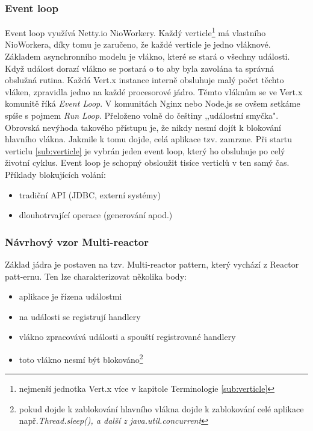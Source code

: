 \subsubsection{Event loop}

Event loop využívá Netty.io NioWorkery. Každý verticle\footnote{nejmenší jednotka Vert.x více v kapitole Terminologie \ref{sub:verticle}} má vlastního NioWorkera, díky tomu je zaručeno, že každé verticle je jedno vláknové. Základem asynchronního modelu je vlákno, které se stará o všechny události. Když událost dorazí vlákno se postará o to aby byla zavolána ta správná obslužná rutina. Každá Vert.x instance interně obsluhuje malý počet těchto vláken, zpravidla jedno na každé procesorové jádro. Těmto vláknům se ve Vert.x komunitě říká \emph{Event Loop}. V komunitách Nginx nebo Node.js se ovšem setkáme spíše s pojmem \emph{Run Loop}. Přeloženo volně do češtiny ,,událostní smyčka". Obrovská nevýhoda takového přístupu je, že nikdy nesmí dojít k blokování hlavního vlákna. Jakmile k tomu dojde, celá aplikace tzv. zamrzne. Při startu verticlu \ref{sub:verticle} je vybrán jeden event loop, který ho obsluhuje po celý životní cyklus. Event loop je schopný obsloužit tisíce verticlů v ten samý čas. Příklady blokujících volání:
\begin{itemize}
\item{tradiční API (JDBC, externí systémy)}
\item{dlouhotrvající operace (generování apod.)}
\end{itemize}

\subsubsection{Návrhový vzor Multi-reactor}\label{sub:multireactor}

Základ jádra je postaven na tzv.
Multi-reactor pattern\cite{eventLoops}, který vychází z Reactor 
patt-ernu\cite{reactorPattern}. Ten lze charakterizovat několika body:

\begin{itemize}
\item{aplikace je řízena událostmi}
\item{na události se registrují handlery}
\item{vlákno zpracovává události a spouští registrované handlery}
\item{toto vlákno nesmí být blokováno\footnote{pokud dojde k zablokování hlavního vlákna dojde k zablokování celé aplikace např.\emph{Thread.sleep(), a další z java.util.concurrent }}}
\end{itemize}

